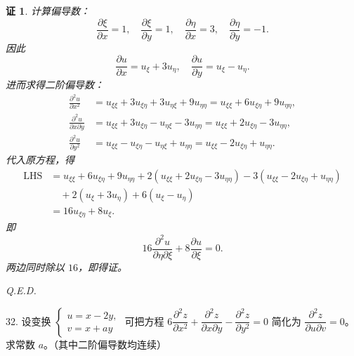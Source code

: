 \documentclass[a4paper,12pt]{article}
\newtheorem*{pf}{证}
\begin{document}
\begin{pf}
    计算偏导数：
    $$
        \frac{\partial\xi}{\partial x}=1,\quad \frac{\partial\xi}{\partial y}=1,\quad \frac{\partial\eta}{\partial x}=3,\quad \frac{\partial\eta}{\partial y}=-1.
    $$
    因此
    $$
        \frac{\partial u}{\partial x}=u_\xi+3u_\eta,\quad \frac{\partial u}{\partial y}=u_\xi-u_\eta.
    $$
    进而求得二阶偏导数：
    $$
        \begin{aligned}
            \frac{\partial^2u}{\partial x^2}         & =u_{\xi\xi}+3u_{\xi\eta}+3u_{\eta\xi}+9u_{\eta\eta}=u_{\xi\xi}+6u_{\xi\eta}+9u_{\eta\eta}, \\
            \frac{\partial^2u}{\partial x\partial y} & =u_{\xi\xi}+3u_{\xi\eta}-u_{\eta\xi}-3u_{\eta\eta}=u_{\xi\xi}+2u_{\xi\eta}-3u_{\eta\eta},  \\
            \frac{\partial^2u}{\partial y^2}         & =u_{\xi\xi}-u_{\xi\eta}-u_{\eta\xi}+u_{\eta\eta}=u_{\xi\xi}-2u_{\xi\eta}+u_{\eta\eta}.
        \end{aligned}
    $$
    代入原方程，得
    $$
        \begin{aligned}
            \text{LHS} & =u_{\xi\xi}+6u_{\xi\eta}+9u_{\eta\eta}+2(u_{\xi\xi}+2u_{\xi\eta}-3u_{\eta\eta})-3(u_{\xi\xi}-2u_{\xi\eta}+u_{\eta\eta}) \\
                       & \quad +2(u_\xi+3u_\eta)+6(u_\xi-u_\eta)                                                                                 \\
                       & =16u_{\xi\eta}+8u_{\xi}.
        \end{aligned}
    $$
    即
    $$
        16\dfrac{\partial^2 u}{\partial \eta\partial \xi} + 8\dfrac{\partial u}{\partial \xi} = 0.
    $$
    两边同时除以 $16$，即得证。

    Q.E.D.
\end{pf}

32. 设变换 $\begin{cases} u = x - 2y, \\ v = x + ay \end{cases}$ 可把方程 $6\dfrac{\partial^2 z}{\partial x^2} + \dfrac{\partial^2 z}{\partial x\partial y} - \dfrac{\partial^2 z}{\partial y^2} = 0$ 简化为 $\dfrac{\partial^2 z}{\partial u\partial v} = 0$。求常数 $a$。（其中二阶偏导数均连续）
\end{document}
